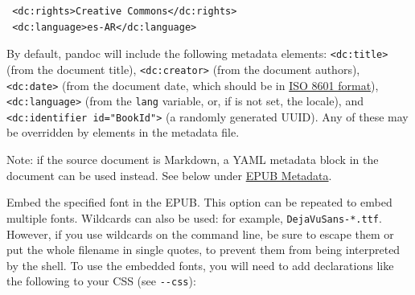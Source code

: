 \documentclass[
]{article}
\begin{document}
\begin{description}
\begin{verbatim}
 <dc:rights>Creative Commons</dc:rights>
 <dc:language>es-AR</dc:language>
\end{verbatim}

By default, pandoc will include the following metadata elements:
\texttt{\textless{}dc:title\textgreater{}} (from the document title),
\texttt{\textless{}dc:creator\textgreater{}} (from the document
authors), \texttt{\textless{}dc:date\textgreater{}} (from the document
date, which should be in \href{https://www.w3.org/TR/NOTE-datetime}{ISO
8601 format}), \texttt{\textless{}dc:language\textgreater{}} (from the
\texttt{lang} variable, or, if is not set, the locale), and
\texttt{\textless{}dc:identifier\ id="BookId"\textgreater{}} (a randomly
generated UUID). Any of these may be overridden by elements in the
metadata file.

Note: if the source document is Markdown, a YAML metadata block in the
document can be used instead. See below under
\protect\hyperlink{epub-metadata}{EPUB Metadata}.
\item[\texttt{-\/-epub-embed-font=}\emph{FILE}]
Embed the specified font in the EPUB. This option can be repeated to
embed multiple fonts. Wildcards can also be used: for example,
\texttt{DejaVuSans-*.ttf}. However, if you use wildcards on the command
line, be sure to escape them or put the whole filename in single quotes,
to prevent them from being interpreted by the shell. To use the embedded
fonts, you will need to add declarations like the following to your CSS
(see \texttt{-\/-css}):


\end{description}
\end{document}

